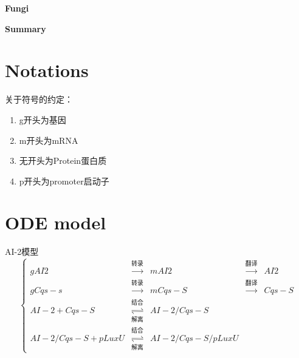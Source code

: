 \documentclass[12pt]{article}
\begin{document}
\graphicspath{{.}}  %
\thispagestyle{empty}



\vspace{20pt}
\centerline{{\Large \textbf{Fungi}}}
\vspace{15pt}

\centerline{{\large \textbf{Summary}}}
\vspace{7pt}






\newpage
\thispagestyle{empty}
\setcounter{page}{0}
\tableofcontents                                                  %
\newpage                                                          %
\section{Notations}
关于符号的约定：
\begin{enumerate}
    \item g开头为基因
    \item m开头为mRNA
    \item 无开头为Protein蛋白质
    \item p开头为promoter启动子
\end{enumerate}

\section{ODE model}
AI-2模型
\begin{equation}
    \left\{
    \begin{array}{lllll}
        gAI2  & \overset{转录}{\rightarrow}  &  mAI2 & \overset{翻译}{\rightarrow}  &  AI2\\
        gCqs-s  & \overset{转录}{\rightarrow}  &  mCqs-S & \overset{翻译}{\rightarrow}  &  Cqs-S\\
        AI-2 + Cqs-S & \underset{解离}{\overset{结合}{ \rightleftharpoons }} & AI-2/Cqs-S \\
        AI-2/Cqs-S + pLuxU &  \underset{解离}{\overset{结合}{ \rightleftharpoons }} & AI-2/Cqs-S/pLuxU
    \end{array}\right.
\end{equation}
\end{document}
